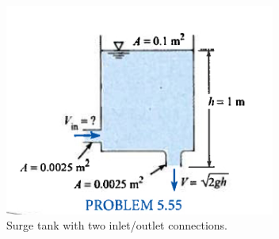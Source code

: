 \documentclass[12pt]{article}
\begin{document}
\begin{enumerate}
\begin{figure}[h!] %
   \centering
   \includegraphics[width=3.5in]{TwoHoleTank.jpg} 
   \caption{Surge tank with two inlet/outlet connections.}
   \label{fig:TwoHoleTank}
\end{figure}

\end{enumerate}
\end{document}
